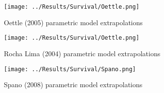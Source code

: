 \begin{figure}[h]
    \centering
    \texttt{[image: ../Results/Survival/Oettle.png]}
    \caption{Oettle (2005) parametric model extrapolations}
    \label{fig:oettleParamExtrap}
\end{figure}

\begin{figure}[h]
    \centering
    \texttt{[image: ../Results/Survival/Oettle.png]}
    \caption{Rocha Lima (2004) parametric model extrapolations}
    \label{fig:rochaLimaParamExtrap}
\end{figure}

\begin{figure}[h]
    \centering
    \texttt{[image: ../Results/Survival/Spano.png]}
    \caption{Spano (2008) parametric model extrapolations}
    \label{fig:spanoParamExtrap}
\end{figure}
